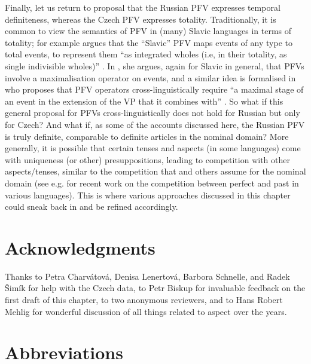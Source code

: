 \documentclass[output=paper,colorlinks,citecolor=brown]{langscibook}
\begin{document}
Finally, let us return to  proposal that the Russian PFV expresses temporal definiteness, whereas the Czech PFV expresses totality. Traditionally, it is common to view the semantics of PFV in (many) Slavic languages in terms of totality; for example \citet[][]{Filip1999} argues that the ``Slavic'' PFV maps events of any type to total events, to represent them ``as integrated wholes (i.e, in their totality, as single indivisible wholes)'' \citep[][184]{Filip1999}. In \citet{Filip2008}, she argues, again for Slavic in general, that PFVs involve a maximalisation operator on events, and a similar idea is formalised in \citet{altshuler14} who proposes that PFV operators cross-linguistically require ``a maximal stage of an event in the extension of the VP that it combines with'' \citep[][762]{altshuler14}. So what if this general proposal for PFVs cross-linguistically does not hold for Russian but only for Czech? And what if, as some of the accounts discussed here, the Russian PFV is truly definite, comparable to definite articles in the nominal domain? More generally, it is possible that certain tenses and aspects (in some languages) come with uniqueness (or other) presuppositions, leading to competition with other aspects/tenses, similar to the competition that \citet{heim11} and others assume for the nominal domain (see e.g. \citealt{zhaodiss} for recent work on the competition between perfect and past in various languages). This is where various approaches discussed in this chapter could sneak back in and be refined accordingly.

\section*{Acknowledgments}
\largerpage

Thanks to Petra Charvátová, Denisa Lenertová, Barbora Schnelle, and Radek Šimík for help with the Czech data, to Petr Biskup for invaluable feedback on the first draft of this chapter, to two anonymous reviewers, and to Hans Robert Mehlig for wonderful discussion of all things related to aspect over the years.


\section*{Abbreviations}
\end{document}
